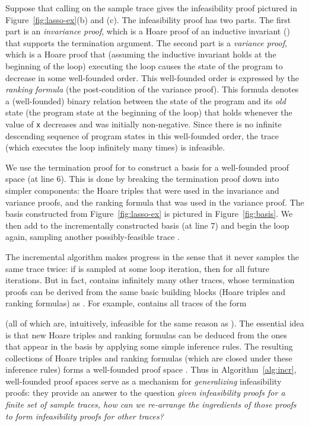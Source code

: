 \documentclass[9pt,nocopyrightspace]{sigplanconf}
\theoremstyle{definition}
\begin{document}
Suppose that calling  on the sample trace
 gives the infeasibility proof pictured in Figure~\ref{fig:lasso-ex}(b)
and (c).  The infeasibility proof has two parts.  The first part is an
\emph{invariance proof}, which is a Hoare proof of an inductive invariant
(\mbox{\color{mygreen}}) that supports the termination
argument.  The second part is a \emph{variance proof}, which is a Hoare proof
that (assuming the inductive invariant holds at the beginning of the loop)
executing the loop causes the state of the program to decrease in some
well-founded order.  This well-founded order is expressed by the \emph{ranking
  formula} {\color{purple}} (the post-condition of the variance proof).  This
formula denotes a (well-founded) binary relation between the state of the
program and its \emph{old} state (the program state at the beginning of the
loop) that holds whenever the value of \texttt{x} decreases and was initially
non-negative.  Since there is no infinite descending sequence of program
states in this well-founded order, the trace  (which executes the loop
infinitely many times) is infeasible.

We use the termination proof for  to construct a basis  for a
well-founded proof space (at line 6).  This is done by breaking the
termination proof down into simpler components: the Hoare triples that were
used in the invariance and variance proofs, and the ranking formula that was
used in the variance proof.  The basis  constructed from
Figure~\ref{fig:lasso-ex} is pictured in Figure~\ref{fig:basis}.  We then add
 to the incrementally constructed basis  (at line 7) and begin the loop again,
sampling another possibly-feasible trace \mbox{}.

The incremental algorithm makes progress in the sense that it never samples
the same trace twice: if  is sampled at some loop iteration, then  for all future iterations.  But in fact,
 contains infinitely many other traces, whose termination
proofs can be derived from the same basic building blocks (Hoare triples and
ranking formulas) as .  For example, 
contains all traces of the form

(all of which are, intuitively, infeasible for the same reason as ).
The essential idea is that new Hoare triples and ranking formulas can
be deduced from the ones that appear in the basis  by applying some simple
inference rules.  The resulting collections of Hoare triples and ranking
formulas (which are closed under these inference rules) forms a well-founded
proof space .  Thus in Algorithm~\ref{alg:incr}, well-founded
proof spaces serve as a mechanism for \emph{generalizing} infeasibility
proofs: they provide an answer to the question \emph{given infeasibility
  proofs for a finite set of sample traces, how can we re-arrange the
  ingredients of those proofs to form infeasibility proofs for other traces?}
\end{document}
